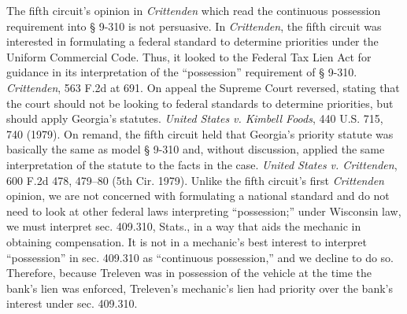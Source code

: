 The fifth circuit's opinion in \textit{Crittenden} which read the continuous
possession requirement into {\S} 9-310 is not persuasive. In
\textit{Crittenden}, the fifth circuit was interested in formulating a federal
standard to determine priorities under the Uniform Commercial Code. Thus, it
looked to the Federal Tax Lien Act for guidance in its interpretation of the
``possession'' requirement of {\S} 9-310. \textit{Crittenden}, 563 F.2d at
691. On appeal the Supreme Court reversed, stating that the court should not be
looking to federal standards to determine priorities, but should apply
Georgia's statutes. \textit{United States v. Kimbell Foods}, 440 U.S. 715, 740
(1979). On remand, the fifth circuit held that Georgia's priority statute was
basically the same as model {\S} 9-310 and, without discussion, applied the
same interpretation of the statute to the facts in the case. \textit{United
States v. Crittenden}, 600 F.2d 478, 479--80 (5th Cir. 1979). Unlike the fifth
circuit's first \textit{Crittenden} opinion, we are not concerned with
formulating a national standard and do not need to look at other federal laws
interpreting ``possession;'' under Wisconsin law, we must interpret sec.
409.310, Stats., in a way that aids the mechanic in obtaining compensation. It
is not in a mechanic's best interest to interpret ``possession'' in sec.
409.310 as ``continuous possession,'' and we decline to do so. Therefore,
because Treleven was in possession of the vehicle at the time the bank's lien
was enforced, Treleven's mechanic's lien had priority over the bank's interest
under sec. 409.310.

